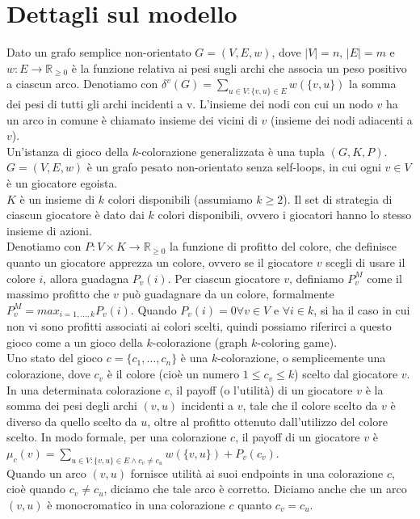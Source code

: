 \section{Dettagli sul modello}
\justify
Dato un grafo semplice non-orientato \(G = (V, E, w)\), dove \(|V| = n\), \(|E| = m\) e \(w : E\rightarrow\mathds{R}_{\geq 0}\) è la funzione relativa ai pesi sugli archi che associa un peso positivo a ciascun arco. Denotiamo con \(\delta^v (G) = \sum_{u \in V : \{v, u\} \in E} w(\{v, u\})\) la somma dei pesi di tutti gli archi incidenti a v. L'insieme dei nodi con cui un nodo \(v\) ha un arco in comune è chiamato insieme dei vicini di \(v\) (insieme dei nodi adiacenti a \(v\)).\\
Un'istanza di gioco della \(k\)-colorazione generalizzata è una tupla \((G, K, P)\). \(G = (V, E, w)\) è un grafo pesato non-orientato senza self-loops, in cui ogni \(v \in V\) è un giocatore egoista.\\
\(K\) è un insieme di \(k\) colori disponibili (assumiamo \(k \geq 2\)). Il set di strategia di ciascun giocatore è dato dai \(k\) colori disponibili, ovvero i giocatori hanno lo stesso insieme di azioni.\\
Denotiamo con \(P : V \times K \rightarrow \mathds{R}_{\geq 0}\) la funzione di profitto del colore, che definisce quanto un giocatore apprezza un colore, ovvero se il giocatore \(v\) scegli di usare il colore \(i\), allora guadagna \(P_v (i)\). Per ciascun giocatore \(v\), definiamo \(P_v^M\) come il massimo profitto che \(v\) può guadagnare da un colore, formalmente \(P_v^M = max_{i=1,\ldots,k} P_v (i)\). Quando \(P_v (i) = 0 \forall v \in V\) e \(\forall i \in k\), si ha il caso in cui non vi sono profitti associati ai colori scelti, quindi possiamo riferirci a questo gioco come a un gioco della \(k\)-colorazione (graph \(k\)-coloring game).\\
Uno stato del gioco \(c = \{c_1,\ldots,c_n\}\) è una \(k\)-colorazione, o semplicemente una colorazione, dove \(c_v\) è il colore (cioè un numero \(1 \leq c_v \leq k\)) scelto dal giocatore \(v\). In una determinata colorazione \(c\), il payoff (o l'utilità) di un giocatore \(v\) è la somma dei pesi degli archi \((v, u)\) incidenti a \(v\), tale che il colore scelto da \(v\) è diverso da quello scelto da \(u\), oltre al profitto ottenuto dall'utilizzo del colore scelto. In modo formale, per una colorazione \(c\), il payoff di un giocatore \(v\) è \(\mu_c (v) = \sum_{u \in V:\{v, u\} \in E \wedge c_v \neq c_u} w(\{v, u\}) + P_v(c_v)\).\\
Quando un arco \((v, u)\) fornisce utilità ai suoi endpoints in una colorazione \(c\), cioè quando \(c_v \neq c_u\), diciamo che tale arco è corretto. Diciamo anche che un arco \((v, u)\) è monocromatico in una colorazione \(c\) quanto \(c_v = c_u\).\\
